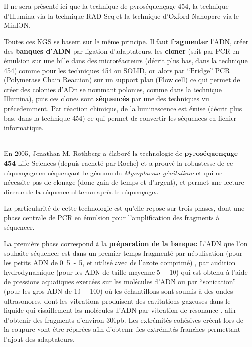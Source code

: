 \documentclass[a4paper,11pt,twoside]{report}
\begin{document}
Il ne sera présenté ici que la technique de pyroséquençage 454, la technique d'Illumina via la technique RAD-Seq et la technique d'Oxford Nanopore via le MinION.

Toutes ces NGS se basent sur le même principe. Il faut \textbf{fragmenter} l'ADN, créer des \textbf{banques d'ADN} par ligation d'adaptateurs, les \textbf{cloner} (soit par PCR en émulsion sur une bille dans des microréacteurs (décrit plus bas, dans la technique 454) comme pour les techniques 454 ou SOLID, ou alors par ``Bridge'' PCR (Polymerase Chain Reaction) sur un support plan (Flow cell) ce qui permet de créer des colonies d'ADn se nommant polonies, comme dans la technique Illumina), puis ces clones sont \textbf{séquencés} par une des techniques vu précedemment. Par réaction chimique, de la luminescence est émise (décrit plus bas, dans la technique 454) ce qui permet de convertir les séquences en fichier informatique.

~~\\

En 2005, Jonathan M. Rothberg a élaboré la technologie de \textbf{pyroséquençage 454} Life Sciences (depuis racheté par Roche) et a prouvé la robustesse de ce séquençage en séquençant le génome de \textit{Mycoplasma génitalium} \citep{Margulies2005aa} et qui ne nécessite pas de clonage (donc gain de temps et d’argent), et permet une lecture directe de la séquence obtenue après le séquençage.\citep{sengenes2012developpement}.

La particularité de cette technologie est qu'elle repose sur trois phases, dont une phase centrale de PCR en émulsion pour l'amplification des fragments à séquencer. \citep{Margulies2005aa} \citep{sengenes2012developpement}

La première phase correspond à la \textbf{préparation de la banque:} L’ADN que l'on souhaite séquencer est dans un premier temps fragmenté par nébulisation \citep{loman2012performance} (pour les petits ADN de \unit{0.5-5}{\micro\metre}\citep{Prodromou2007aa}, et utilisé avec de l'azote comprimé)\citep{syed2009next} , par audition hydrodynamique \citep{poptsova2014non} (pour les ADN de taille moyenne \unit{5-10}{\micro\metre})\citep{Prodromou2007aa} qui est obtenu à l'aide de pressions aquatiques exercées sur les molécules d'ADN \citep{poptsova2014non} ou par ``sonication'' \citep{Knierim2011aa} (pour les gros ADN de \unit{10-100}{\micro\metre})\citep{Prodromou2007aa} où les échantillons sont soumis à des ondes ultrasonores, dont les vibrations produisent des cavitations gazeuses dans le liquide qui cisaillement les molécules d'ADN par vibration de résonance \citep{Knierim2011aa}. afin d'obtenir des fragments d'environ 300pb. Les extrémités cohésives créent lors de la coupure vont être réparées afin d’obtenir des extrémités franches permettant l’ajout des adaptateurs.\citep{Prodromou2007aa} \citep{sengenes2012developpement}
\end{document}
